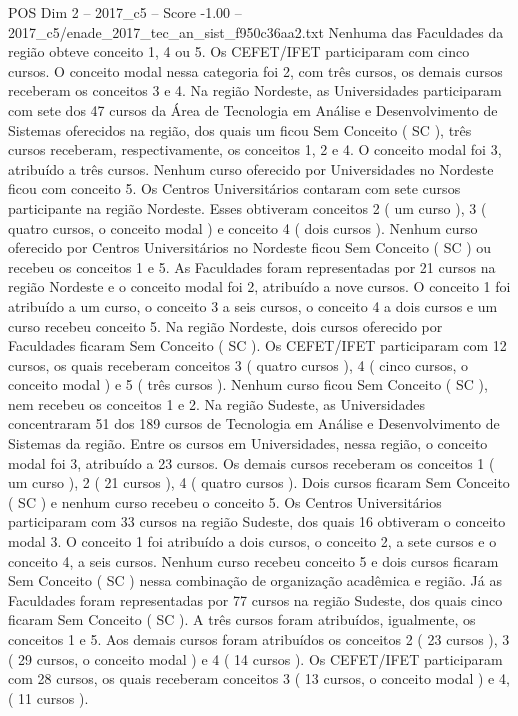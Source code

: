 \begin{textsample}{POS Dim 2 – 2017\_c5 – Score -1.00 – 2017\_c5/enade\_2017\_tec\_an\_sist\_f950c36aa2.txt}
Nenhuma das Faculdades da região obteve conceito 1, 4 ou 5.
Os CEFET/IFET participaram com cinco cursos.
O conceito modal nessa categoria foi 2, com três cursos, os demais cursos receberam os conceitos 3 e 4.
Na região Nordeste, as Universidades participaram com sete dos 47 cursos da Área de Tecnologia em Análise e Desenvolvimento de Sistemas oferecidos na região, dos quais um ficou Sem Conceito ( SC ), três cursos receberam, respectivamente, os conceitos 1, 2 e 4.
O conceito modal foi 3, atribuído a três cursos.
Nenhum curso oferecido por Universidades no Nordeste ficou com conceito 5.
Os Centros Universitários contaram com sete cursos participante na região Nordeste.
Esses obtiveram conceitos 2 ( um curso ), 3 ( quatro cursos, o conceito modal ) e conceito 4 ( dois cursos ).
Nenhum curso oferecido por Centros Universitários no Nordeste ficou Sem Conceito ( SC ) ou recebeu os conceitos 1 e 5.
As Faculdades foram representadas por 21 cursos na região Nordeste e o conceito modal foi 2, atribuído a nove cursos.
O conceito 1 foi atribuído a um curso, o conceito 3 a seis cursos, o conceito 4 a dois cursos e um curso recebeu conceito 5.
Na região Nordeste, dois cursos oferecido por Faculdades ficaram Sem Conceito ( SC ).
Os CEFET/IFET participaram com 12 cursos, os quais receberam conceitos 3 ( quatro cursos ), 4 ( cinco cursos, o conceito modal ) e 5 ( três cursos ).
Nenhum curso ficou Sem Conceito ( SC ), nem recebeu os conceitos 1 e 2.
Na região Sudeste, as Universidades concentraram 51 dos 189 cursos de Tecnologia em Análise e Desenvolvimento de Sistemas da região.
Entre os cursos em Universidades, nessa região, o conceito modal foi 3, atribuído a 23 cursos.
Os demais cursos receberam os conceitos 1 ( um curso ), 2 ( 21 cursos ), 4 ( quatro cursos ).
Dois cursos ficaram Sem Conceito ( SC ) e nenhum curso recebeu o conceito 5.
Os Centros Universitários participaram com 33 cursos na região Sudeste, dos quais 16 obtiveram o conceito modal 3.
O conceito 1 foi atribuído a dois cursos, o conceito 2, a sete cursos e o conceito 4, a seis cursos.
Nenhum curso recebeu conceito 5 e dois cursos ficaram Sem Conceito ( SC ) nessa combinação de organização acadêmica e região.
Já as Faculdades foram representadas por 77 cursos na região Sudeste, dos quais cinco ficaram Sem Conceito ( SC ).
A três cursos foram atribuídos, igualmente, os conceitos 1 e 5.
Aos demais cursos foram atribuídos os conceitos 2 ( 23 cursos ), 3 ( 29 cursos, o conceito modal ) e 4 ( 14 cursos ).
Os CEFET/IFET participaram com 28 cursos, os quais receberam conceitos 3 ( 13 cursos, o conceito modal ) e 4, ( 11 cursos ).

\end{textsample}
